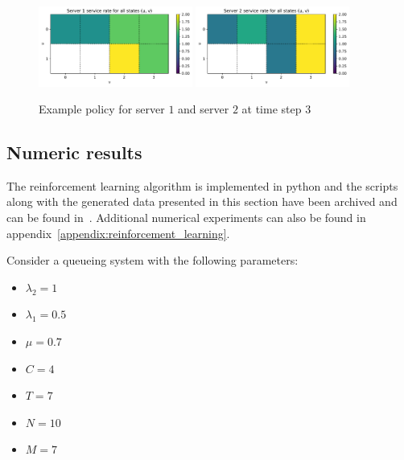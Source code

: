 \begin{figure}[H]
    \includegraphics[width=0.45\textwidth]{chapters/06_agent_based_extension/Bin/reinforcement_learning_policy_example/server_1_3.pdf}
    \includegraphics[width=0.45\textwidth]{chapters/06_agent_based_extension/Bin/reinforcement_learning_policy_example/server_2_3.pdf}
    \caption{Example policy for server \(1\) and server \(2\) at time step \(3\)}
    \label{fig:reinforcement_learning_policy_exmaple_3}
\end{figure}



\subsection{Numeric results}\label{sec:reiforcement_learning_numeric_results}

The reinforcement learning algorithm is implemented in python and the scripts
along with the generated data presented in this section have been archived and
can be found in~\cite{michalis_panayides_2023_7586860}.
Additional numerical experiments can also be found in
appendix~\ref{appendix:reinforcement_learning}.

Consider a queueing system with the following parameters:

\begin{multicols}{4}
    \begin{itemize}
        \item \(\lambda_2 = 1\)
        \item \(\lambda_1 = 0.5 \)
        \item \(\mu = 0.7\)
        \item \(C = 4\)
        \item \(T = 7\)
        \item \(N = 10\)
        \item \(M = 7 \)
    \end{itemize}
\end{multicols}

